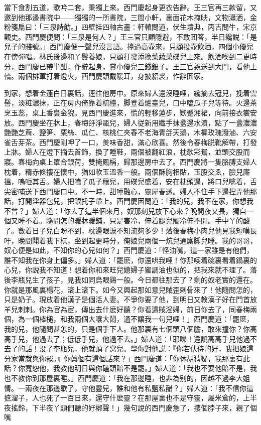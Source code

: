 當下食割五道，歌吟二套，秉獨上來。西門慶起身更衣告辭。王三官再三款留，又邀到他那邊書院中——獨獨的一所書院，三間小軒，裏面花木掩映，文物瀟洒，金粉箋扁曰：「三泉詩舫。」四壁挂四軸古畫：軒轅問道，伏生墳典，丙吉問牛，宋京觀史。西門慶便問：「三泉是何人？」王三官只顧隱避，不敢囬答，半日纔説：「是兒子的賤號。」西門慶便一聲兒沒言語。擡過高壺來，只顧投壺飲酒，四個小優兒在傍彈唱。林氏後邊和丫鬟養娘，只顧打發添換菜蔬菓碟兒上來。飲酒喫到二更時分，西門慶已帶半酣，作辭起身，賞小優兒三錢銀子。王三官親送到大門，看他上轎。兩個排軍打着燈火，西門慶頭戴暖耳，身披貂裘，作辭囬家。

到家，想着金蓮白日裏話，逕往他房中。原來婦人還沒睡哩，纔摘去冠兒，挽着雲髻，淡粧濃抹，正在房内倚靠着梳檯，脚登着爐臺兒，口中嗑瓜子兒等待。火邊茶烹玉蕊，桌上香裊金猊。見西門慶進來，慌的輕移蓮步，欵蹙湘裙，向前接衣裳安放。西門慶坐在牀上，春梅㧱淨甌兒，婦人従新用纖手抹盞邊水漬，點了一盞濃濃艷艷芝蔴、鹽笋、栗絲、瓜仁、核桃仁夾春不老海青㧱天鵝，木樨玫瑰潑滷、六安雀舌芽茶。西門慶剛呷了一口，羙味香甜，滿心欣喜。然後令春梅脱靴解帶，打發上牀。婦人在燈下摘去首飾，換了睡鞋，兩個被翻紅浪，枕欹彩鴛，並頭交股而寢。春梅向桌上罩合銀荷，雙掩鳳槅，歸那邊房中去了。西門慶將一隻胳膊支婦人枕着，精赤條摟在懷中，猶如軟玉溫香一般。兩個酥胸相貼，玉股交ゑ，臉兒廝搵，嗚咂其舌。婦人把嗑了瓜子穰兒，用碟兒盛着，安在枕頭邊，將口兒噙着，舌尖密哺送下西門慶口中。不一時，甜唾融心，靈犀春透。婦人不住手下邊揑弄他那話，打開淫器包兒，把銀托子帶上。西門慶因問道：「我的兒，我不在家，你想我不曾？」婦人道：「你去了這半個來月，奴那刻兒放下心來？晚間夜又長，獨自一個又睡不着。隨問怎的暖牀暖鋪，只是害冷，伸着腿兒觸冷伸不開。手中丫的酸了。數着日子兒白盼不到，枕邊眼淚不知流夠多少！落後春梅小肉兒他見我短嘆長吁，晚間鬦着我下棋，坐到起更時分，俺娘兒兩個一炕兒通廝脚兒睡。我的哥哥，奴心便是如此，不知你的心兒如何？」西門慶道：「怪油嘴，這一家雖是有他們，誰不知我在你身上偏多。」婦人道：「罷麽，你還哄我哩！你那喫着碗裏看着鍋裏的心兒，你説我不知道！想着你和來旺兒媳婦子蜜調油也似的，把我來就不理了。落後李瓶兒生了孩子，見我如同烏眼鷄一般。今日都往那去了？剩的奴老實的還在。你就是那風裏楊花，滚上滚下。如今又興起那如意兒賊歪剌骨來了！他隨問怎的，只是奶子。現放着他漢子是個活人妻。不爭你要了他，到明日又教漢子好在門首放羊兒剌剌。你為官為宦，傳出去什麽好聽？你看這賊淫婦，前日你去了，同春梅兩個，為一個棒槌，和我兩個大嚷大鬧，通不讓我一句兒哩！」西門慶道：「罷麽，我的兒，他隨問甚怎的，只是個手下人。他那裏有七個頭八個膽，敢來撞你？你高高手兒，他過去了；低低手兒，他過不去。」婦人道：「耶嚛！還說高高手兒他過不去了的話！没了李瓶兒，他就頂了窝兒。學你對他説：『你若伏侍的好，我把娘這分家當就與你罷。』你眞個有這個話來？」西門慶道：「你休胡猜疑，我那裏有此話？你寬恕他，我教他明日與你磕頭賠不是罷。」婦人道：「我也不要他賠不是，我也不教你到那屋裏睡。」西門慶道：「我在那邊睡，也非為别的，因越不過李大姐情。一兩夜在那邊歇了，守他靈兒，誰和他有私鹽私醋？」婦人道：「我不信你這摭溜子，人也死了一百日來，還守什麽靈？在那屋裏也不是守靈，屬米倉的，上半夜搖鈴，下半夜丫頭們聽的好梆聲！」幾句說的西門慶急了，摟個脖子來，親了個嘴